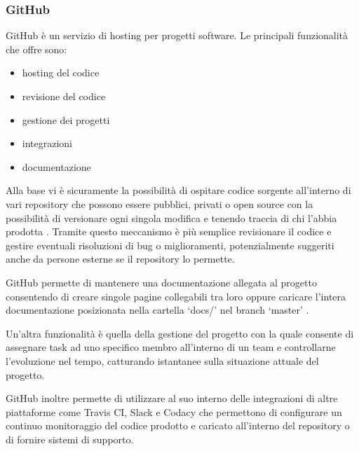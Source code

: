 \subsubsection{GitHub}
GitHub è un servizio di hosting per progetti software. Le principali funzionalità che offre sono:
\begin{itemize}
\item hosting del codice
\item revisione del codice
\item gestione dei progetti
\item integrazioni
\item documentazione
\end{itemize}

Alla base vi è sicuramente la possibilità di ospitare codice sorgente all'interno di vari repository che possono essere pubblici, privati o open source con la possibilità di versionare ogni singola modifica e tenendo traccia di chi l'abbia prodotta \cite{GitHub}.
Tramite questo meccanismo è più semplice revisionare il codice e gestire eventuali risoluzioni di bug o miglioramenti, potenzialmente suggeriti anche da persone esterne se il repository lo permette.

GitHub permette di mantenere una documentazione allegata al progetto consentendo di creare singole pagine collegabili tra loro oppure caricare l'intera documentazione posizionata nella cartella `docs/' nel branch `master' \cite{GitHub}.

Un'altra funzionalità è quella della gestione del progetto con la quale consente di assegnare task ad uno specifico membro all'interno di un team e controllarne l'evoluzione nel tempo, catturando istantanee sulla situazione attuale del progetto.

GitHub inoltre permette di utilizzare al suo interno delle integrazioni di altre piattaforme come Travis CI,  Slack e Codacy che permettono di configurare un continuo monitoraggio del codice prodotto e caricato all'interno del repository o di fornire sistemi di supporto.

